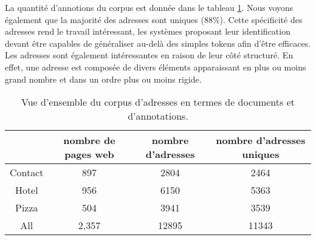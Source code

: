 \documentclass[PhD-Yoann-Dupont.tex]{subfiles}
\begin{document}
La quantité d'annotions du corpus est donnée dans le tableau \ref{tab:address-overview}. Nous voyons également que la majorité des adresses sont uniques (88\%). Cette spécificité des adresses rend le travail intéressant, les systèmes proposant leur identification devant être capables de généraliser au-delà des simples tokens afin d'être efficaces. Les adresses sont également intéressantes en raison de leur côté structuré. En effet, une adresse est composée de divers éléments apparaissant en plus ou moins grand nombre et dans un ordre plus ou moins rigide.

\begin{table}[ht!]
\begin{tabular}{|c|ccc|}
\cline{2-4}
\multicolumn{1}{c|}{}   & nombre de pages web   & nombre d'adresses & nombre d'adresses uniques \\
\hline
Contact                 & 897                   & 2804              & 2464 \\
Hotel                   & 956                   & 6150              & 5363 \\
Pizza                   & 504                   & 3941              & 3539 \\
\hline
All                     & 2,357                 & 12895             & 11343 \\
\hline
\end{tabular}
\caption{Vue d'ensemble du corpus d'adresses en termes de documents et d'annotations.}
\label{tab:address-overview}
\end{table}
\end{document}
